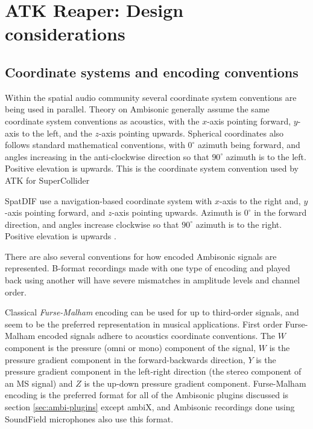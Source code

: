 \documentclass{article}
\begin{document}
\section{ATK Reaper: Design considerations}\label{sec:design}

\subsection{Coordinate systems and encoding conventions}\label{sec:coordinate-systems}

Within the spatial audio community several coordinate system conventions are being used in parallel.
Theory on Ambisonic generally assume the same coordinate system conventions as acoustics, with the $x$-axis pointing forward, $y$-axis to the left, and the $z$-axis pointing upwards. 
Spherical coordinates also follows standard mathematical conventions, with $0^{\circ}$ azimuth being forward, and angles increasing in the anti-clockwise direction so that $90^{\circ}$ azimuth is to the left.
Positive elevation is upwards.
This is the coordinate system convention used by ATK for SuperCollider

SpatDIF use a navigation-based coordinate system with $x$-axis to the right and, $y$-axis pointing forward, and $z$-axis pointing upwards.
Azimuth is $0^{\circ}$ in the forward direction, and angles increase clockwise so that $90^{\circ}$ azimuth is to the right.
Positive elevation is upwards \cite{Peters:2013spatdif}.

There are also several conventions for how encoded Ambisonic signals are represented.
B-format recordings made with one type of encoding and played back using another will have severe mismatches in amplitude levels and channel order.

Classical \emph{Furse-Malham} encoding can be used for up to third-order signals, and seem to be the preferred representation in musical applications.
First order Furse-Malham encoded signals adhere to acoustics coordinate conventions.
The $W$ component is the pressure (omni or mono) component of the signal, $W$ is the pressure gradient component in the forward-backwards direction, $Y$ is the pressure gradient component in the left-right direction (the stereo component of an MS signal) and $Z$ is the up-down pressure gradient component.
Furse-Malham encoding is the preferred format for all of the Ambisonic plugins discussed is section \ref{sec:ambi-plugins} except ambiX, and Ambisonic recordings done using SoundField microphones also use this format.
\end{document}
